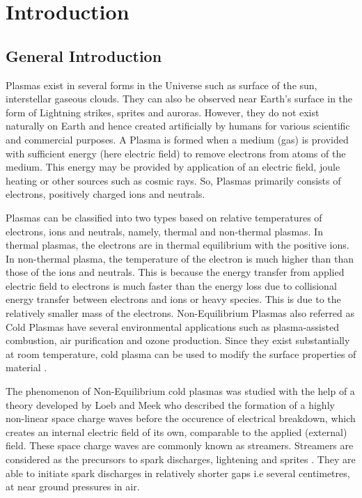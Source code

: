 \chapter{Introduction}
\section{General Introduction}
Plasmas exist in several forms in the Universe such as surface of the sun, interstellar gaseous clouds. They can also be observed near Earth's surface in the form of Lightning strikes, sprites and auroras. However, they do not exist naturally on Earth and hence created artificially by humans for various scientific and commercial purposes. A Plasma is formed when a medium (gas) is provided with sufficient energy (here electric field) to remove electrons from atoms of the medium. This energy may be provided by application of an electric field, joule heating or other sources such as cosmic rays. So, Plasmas primarily consists of electrons, positively charged ions and neutrals.

Plasmas can be classified into two types based on relative temperatures of electrons, ions and neutrals, namely, thermal and non-thermal plasmas. In thermal plasmas, the electrons are in thermal equilibrium with the positive ions. In non-thermal plasma, the temperature of the electron is much higher than than those of the ions and neutrals. This is because the energy transfer from applied electric field to electrons is much faster than the energy loss due to collisional energy transfer between electrons and ions or heavy species. This is due to the relatively smaller mass of the electrons. Non-Equilibrium Plasmas also referred as Cold Plasmas have several environmental applications such as plasma-assisted combustion, air purification and ozone production. Since they exist substantially at room temperature, cold plasma can be used to modify the surface properties of material \cite{Bonizzoni et Vassallo, 2002}.

The phenomenon of Non-Equilibrium cold plasmas was studied with the help of a theory developed by Loeb and Meek \cite{Loeb and Meek , 1940a and 1940b} who described the formation of a highly non-linear space charge waves before the occurence of electrical breakdown, which creates an internal electric field of its own, comparable to the applied (external) field. These space charge waves are commonly known as streamers. Streamers are considered as the precursors to spark discharges, lightening\cite{Bazelyan et Raizer 2000} and sprites \cite{Franz et al 1990; Bourdon et al 2007}. They are able to initiate spark discharges in relatively shorter gaps i.e several centimetres, at near ground pressures in air.  

